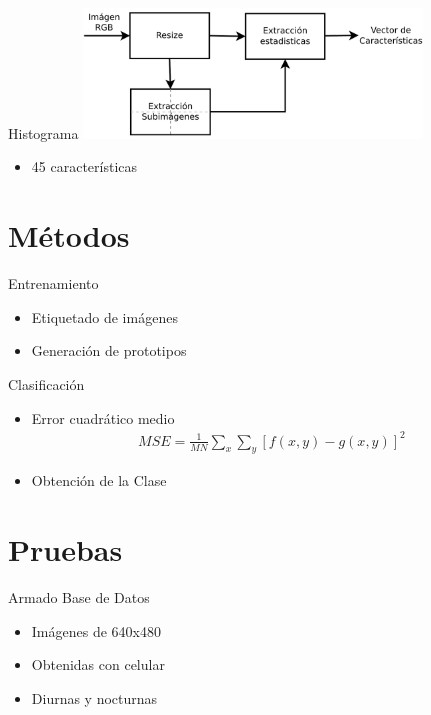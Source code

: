 \documentclass[spanish]{beamer}
\begin{document}
\begin{frame}{Histograma}
  \includegraphics[width=9cm]{../diagramas/procesoestadisticas}
  \begin{itemize}
  \item 45 características
  \end{itemize}
\end{frame}

\section[Outline]{Métodos}

\begin{frame}{Entrenamiento}
  \begin{itemize}
  \item Etiquetado de imágenes
  \item Generación de prototipos
  \end{itemize}
\end{frame}

\begin{frame}{Clasificación}
  \begin{itemize}
  \item Error cuadrático medio
    \begin{align*}
      MSE = \frac{1}{MN} \sum_x\sum_y [ f(x,y) - g(x,y) ]^{2}
    \end{align*}
  \item Obtención de la Clase
  \end{itemize}
\end{frame}

\section[Outline]{Pruebas}

\begin{frame}{Armado Base de Datos}
  \begin{itemize}
  \item Imágenes de 640x480
  \item Obtenidas con celular
  \item Diurnas y nocturnas
  \end{itemize}
\end{frame}
\end{document}
